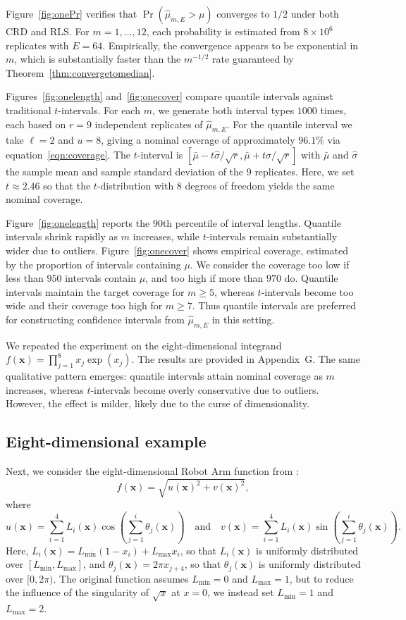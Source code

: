 \documentclass{article}
\theoremstyle{definition}
\renewcommand{\ge}{\geqslant}
\newcommand{\bsx}{\boldsymbol{x}}
\newcommand{\appG}{G}
\begin{document}
Figure~\ref{fig:onePr} verifies that $\Pr(\hat{\mu}_{m,E}>\mu)$ converges to $1/2$ under both CRD and RLS.  For $m=1,\dots,12$, each probability is estimated from $8\times10^6$ replicates with $E=64$. Empirically, the convergence appears to be exponential in $m$, which is substantially faster than the $m^{-1/2}$ rate guaranteed by Theorem~\ref{thm:convergetomedian}.

Figures~\ref{fig:onelength} and~\ref{fig:onecover} compare quantile intervals against traditional $t$-intervals. For each $m$, we generate both interval types $1000$ times, each based on $r=9$ independent replicates of $\hat{\mu}_{m,E}$. For the quantile interval we take $\ell=2$ and $u=8$, giving a nominal coverage of approximately $ 96.1\%$ via equation~\eqref{eqn:coverage}. The $t$-interval is $[\bar{\mu}-t\hat{\sigma}/\sqrt{r},\bar{\mu}+t\hat{\sigma}/\sqrt{r}]$ with $\bar{\mu}$ and $\hat{\sigma}$ the sample mean and sample standard deviation of the $9$ replicates. Here, we set $t\approx2.46$ so that the $t$-distribution with $8$ degrees of freedom yields the same nominal coverage.

Figure~\ref{fig:onelength} reports the $90$th percentile of interval lengths. Quantile intervals shrink rapidly as $m$ increases, while $t$-intervals remain substantially wider due to outliers. Figure~\ref{fig:onecover} shows empirical coverage, estimated by the proportion of intervals containing $\mu$. We consider the coverage too low if less than $950$ intervals contain $\mu$, and too high if  more than $970$ do. Quantile intervals maintain the target coverage for $m\ge 5$, whereas $t$-intervals become too wide and their coverage too high for $m\ge 7$. Thus quantile intervals are preferred for constructing confidence intervals from $\hat{\mu}_{m,E}$ in this setting.

We repeated the experiment on the eight-dimensional integrand $f(\bsx)=\prod_{j=1}^8 x_j\exp(x_j)$. The results are provided in Appendix~\appG. The same qualitative pattern emerges: quantile intervals attain nominal coverage as 
$m$ increases, whereas $t$-intervals become overly conservative due to outliers. However, the effect is milder, likely due to the curse of dimensionality.

\subsection{Eight-dimensional example}\label{subsec:expr2}
Next, we consider the eight-dimensional Robot Arm function from \cite{surj:bing:2013}:
$$f(\bsx)=\sqrt{u(\bsx)^2+v(\bsx)^2},$$
where
$$u(\bsx)=\sum_{i=1}^4 L_i(\bsx)\cos\left(\sum_{j=1}^i \theta_j(\bsx)\right) \quad \text{and}\quad v(\bsx)=\sum_{i=1}^4 L_i(\bsx)\sin\left(\sum_{j=1}^i \theta_j(\bsx)\right).$$
Here, $L_i(\bsx)=L_{\min}(1-x_i)+L_{\max}x_i$, so that $L_i(\bsx)$ is uniformly distributed over $[L_{\min},L_{\max}]$, and $\theta_j(\bsx)=2\pi x_{j+4}$, so that $\theta_j(\bsx)$ is uniformly distributed over $[0,2\pi)$. The original function assumes $L_{\min}=0$ and $L_{\max}=1$, but to reduce the influence of the singularity of $\sqrt{x}$ at $x=0$, we instead set $L_{\min}=1$ and $L_{\max}=2$.
\end{document}
